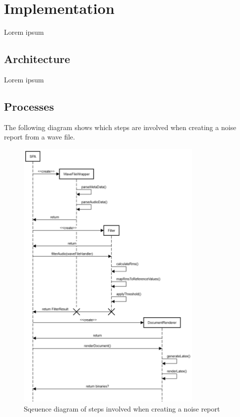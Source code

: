 \section{Implementation}
Lorem ipsum

\subsection{Architecture}
Lorem ipsum

\subsection{Processes}
The following diagram shows which steps are involved when creating a noise report from a wave file.

\begin{figure}[H]
    \centering
    \includegraphics[width=0.8\textwidth]{../assets/sequence_diagram_from_wave_file_to_pdf.png}
    \caption{Sqeuence diagram of steps involved when creating a noise report}
\end{figure}

